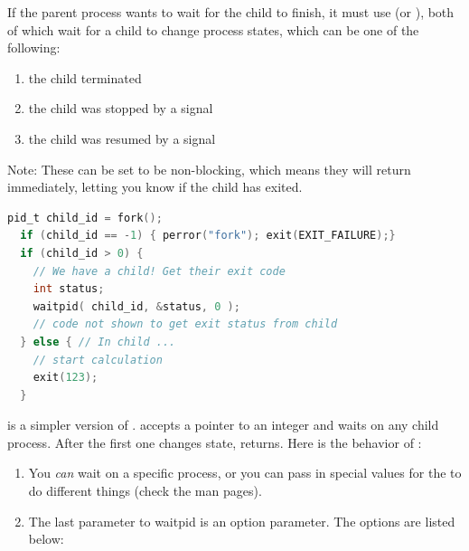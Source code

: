 \begin{itemize}
If the parent process wants to wait for the child to finish, it must use  (or ), both of which wait for a child to change process states, which can be one of the following:

\begin{enumerate}
    \item the child terminated
    \item the child was stopped by a signal
    \item the child was resumed by a signal
\end{enumerate}

Note: These can be set to be non-blocking, which means they will return immediately, letting you know if the child has exited.

\begin{lstlisting}[language=C]
  pid_t child_id = fork();
  if (child_id == -1) { perror("fork"); exit(EXIT_FAILURE);}
  if (child_id > 0) {
    // We have a child! Get their exit code
    int status;
    waitpid( child_id, &status, 0 );
    // code not shown to get exit status from child
  } else { // In child ...
    // start calculation
    exit(123);
  }
\end{lstlisting}

 is a simpler version of .
 accepts a pointer to an integer and waits on any child process.
After the first one changes state,  returns.
Here is the behavior of :
\begin{enumerate}
    \item 
        You \emph{can} wait on a specific process, or you can pass in special values for the  to do different things (check the man pages).

    \item 
        The last parameter to waitpid is an option parameter.
        The options are listed below:
\end{enumerate}


\end{itemize}
